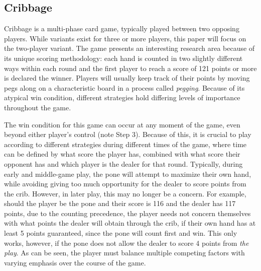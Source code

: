 

\subsection{Cribbage}

Cribbage is a multi-phase card game, typically played between two opposing
players.
%
While variants exist for three or more players, this paper will focus on the
two-player variant.
%
The game presents an interesting research area because of its unique scoring
methodology:
each hand is counted in two slightly different ways within each round and the
first player to reach a score of 121 points or more is declared the winner.
%
Players will usually keep track of their points by moving pegs along on a 
characteristic board
in a process called \textit{pegging}.
%
Because of its atypical win condition, different strategies hold differing
levels of importance throughout the game.




The win condition for this game can occur at any moment of the game,
even beyond either player's control (note Step 3).
%
Because of this,
it is crucial to play according to different strategies during
different times of the game,
where time can be defined by what score the player has,
combined with what score their opponent has
and which player is the dealer for that round.
%
Typically, during early and middle-game play,
the pone will attempt to maximize their own hand,
while avoiding giving too much opportunity for the dealer to score points from
the crib.
%
However, in later play, this may no longer be a concern.
%
For example, should the player be the pone and their score is 116
and the dealer has 117 points,
due to the counting precedence,
the player needs not concern themselves with what points the dealer will obtain
through the crib, if their own hand has at least 5 points guaranteed,
since the pone will count first and win.
%
This only works, however, if the pone does not allow the dealer to score 4
points from \textit{the play}.
%
As can be seen, the player must balance multiple competing factors with varying
emphasis over the course of the game.

